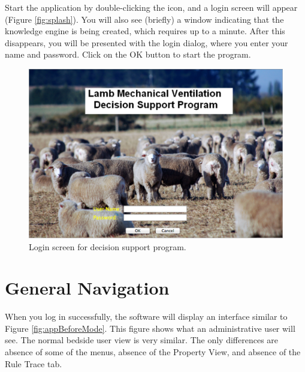 Start the application by double-clicking the icon, and a login screen will appear (Figure \vref{fig:splash}).  You will
also see (briefly) a window indicating that the knowledge engine is being created, which requires up to a minute. After this disappears, you will be presented with the login dialog, where you enter your name and password.  Click on the OK button to 
start the program.

\begin{figure}[htbp] 
   \centering
   \includegraphics[width=\textwidth]{LoginScreen} 
   \caption{Login screen for decision support program.}
   \label{fig:splash}
\end{figure}

\section{General Navigation}

When you log in successfully, the software will display an interface similar to Figure \vref{fig:appBeforeMode}.  This figure
shows what an administrative user will see.  The normal bedside user view is very similar.  The only differences are absence of 
some of the menus, absence of the Property View, and absence of the Rule Trace tab.

